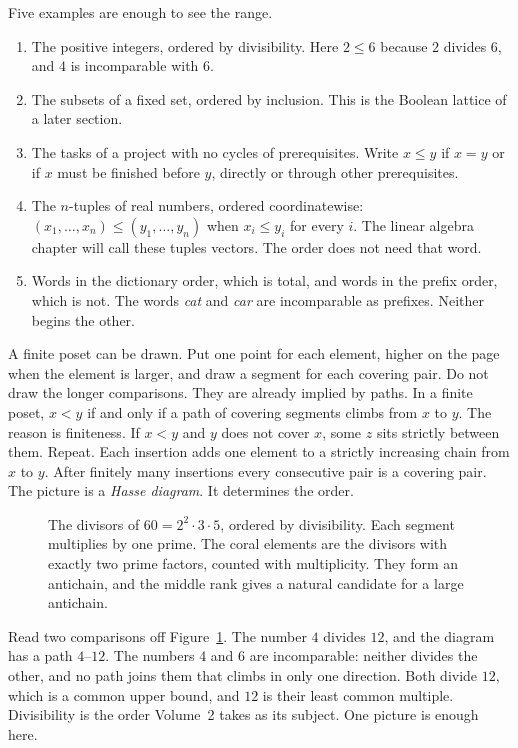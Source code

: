 Five examples are enough to see the range.
\begin{enumerate}[label=(\alph*)]
\item The positive integers, ordered by divisibility. Here $2\le 6$ because $2$ divides $6$, and $4$ is incomparable with $6$.
\item The subsets of a fixed set, ordered by inclusion. This is the Boolean lattice of a later section.
\item The tasks of a project with no cycles of prerequisites. Write $x\le y$ if $x=y$ or if $x$ must be finished before $y$, directly or through other prerequisites.
\item The $n$-tuples of real numbers, ordered coordinatewise: $(x_1,\dots,x_n)\le(y_1,\dots,y_n)$ when $x_i\le y_i$ for every $i$. The linear algebra chapter will call these tuples vectors. The order does not need that word.
\item Words in the dictionary order, which is total, and words in the prefix order, which is not. The words \emph{cat} and \emph{car} are incomparable as prefixes. Neither begins the other.
\end{enumerate}

A finite poset can be drawn. Put one point for each element, higher on the page when the element is larger, and draw a segment for each covering pair. Do not draw the longer comparisons. They are already implied by paths. In a finite poset, $x<y$ if and only if a path of covering segments climbs from $x$ to $y$. The reason is finiteness. If $x<y$ and $y$ does not cover $x$, some $z$ sits strictly between them. Repeat. Each insertion adds one element to a strictly increasing chain from $x$ to $y$. After finitely many insertions every consecutive pair is a covering pair. The picture is a \emph{Hasse diagram}. It determines the order.

\begin{figure}[ht]
\centering
{}
\caption{The divisors of $60=2^2\cdot 3\cdot 5$, ordered by divisibility. Each segment multiplies by one prime. The coral elements are the divisors with exactly two prime factors, counted with multiplicity. They form an antichain, and the middle rank gives a natural candidate for a large antichain.}
\label{orders:fig:divisors}
\end{figure}

Read two comparisons off Figure~\ref{orders:fig:divisors}. The number $4$ divides $12$, and the diagram has a path $4$--$12$. The numbers $4$ and $6$ are incomparable: neither divides the other, and no path joins them that climbs in only one direction. Both divide $12$, which is a common upper bound, and $12$ is their least common multiple. Divisibility is the order Volume~2 takes as its subject. One picture is enough here.

